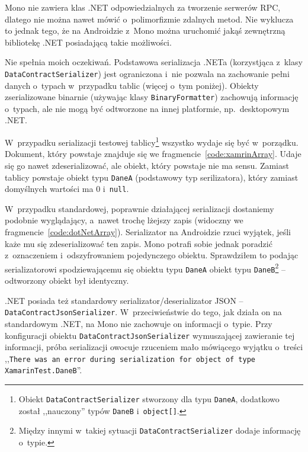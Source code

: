 \begin{description}

Mono nie zawiera klas .NET odpowiedzialnych za tworzenie serwerów RPC, dlatego nie można nawet mówić o~polimorfizmie zdalnych metod.
Nie wyklucza to jednak tego, że na Androidzie z~Mono można uruchomić jakąś zewnętrzną bibliotekę .NET posiadającą takie możliwości.

Nie spełnia moich oczekiwań.
Podstawowa serializacja .NETa (korzystjąca z~klasy \texttt{DataContractSerializer}) jest ograniczona i~nie pozwala na zachowanie pełni danych o~typach w~przypadku tablic (więcej o~tym poniżej).
Obiekty zserializowane binarnie (używając klasy \texttt{BinaryFormatter}) zachowują informację o~typach, ale nie mogą być odtworzone na innej platformie, np.\ desktopowym .NET\@. 

W~przypadku serializacji testowej tablicy\footnote{Obiekt \texttt{DataContractSerializer} stworzony dla typu \texttt{DaneA}, dodatkowo został ,,nauczony'' typów \texttt{DaneB} i~\texttt{object[]}.} wszystko wydaje się być w~porządku. Dokument, który powstaje znajduje się we fragmencie~\ref{code:xamrinArray}. Udaje się go nawet zdeserializować, ale obiekt, który powstaje nie ma sensu. Zamiast tablicy powstaje obiekt typu \texttt{DaneA} (podstawowy typ serilizatora), który zamiast domyślnych wartości ma 0 i~\texttt{null}.

W~przypadku standardowej, poprawnie działającej serializacji dostaniemy podobnie wyglądający, a~nawet trochę lżejszy zapis (widoczny we fragmencie~\ref{code:dotNetArray}).
Serializator na Androidzie rzuci wyjątek, jeśli każe mu się zdeserializować ten zapis.
Mono potrafi sobie jednak poradzić z~oznaczeniem i~odszyfrowaniem pojedynczego obiektu. Sprawdziłem to podając serializatorowi spodziewającemu się obiektu typu \texttt{DaneA} obiekt typu \texttt{DaneB}\footnote{Między innymi w~takiej sytuacji \texttt{DataContractSerializer} dodaje informację o~typie.} -- odtworzony obiekt był identyczny.

.NET posiada też standardowy serializator/deserializator JSON -- \texttt{DataContractJsonSerializer}.
W~przeciwieństwie do tego, jak działa on na standardowym .NET, na Mono nie zachowuje on informacji o~typie.
Przy konfiguracji obiektu \texttt{DataContractJsonSerializer} wymuszającej zawieranie tej informacji, próba serializacji owocuje rzuceniem mało mówiącego wyjątku o~treści ,,\texttt{There was an error during serialization for object of type XamarinTest.DaneB}''.


\end{description}
